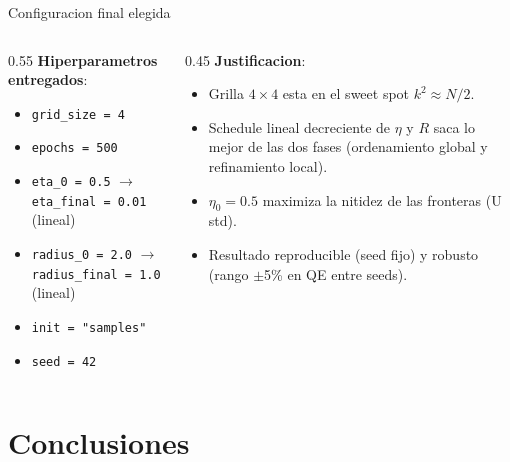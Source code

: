 \documentclass[aspectratio=169, 10pt]{beamer}
\begin{document}
\begin{frame}{Configuracion final elegida}
  \footnotesize
  \begin{columns}[T]
    \begin{column}{0.55\textwidth}
      \textbf{Hiperparametros entregados}:
      \begin{itemize}
        \item \texttt{grid\_size = 4}
        \item \texttt{epochs = 500}
        \item \texttt{eta\_0 = 0.5} $\to$ \texttt{eta\_final = 0.01} (lineal)
        \item \texttt{radius\_0 = 2.0} $\to$ \texttt{radius\_final = 1.0} (lineal)
        \item \texttt{init = "samples"}
        \item \texttt{seed = 42}
      \end{itemize}
    \end{column}
    \begin{column}{0.45\textwidth}
      \textbf{Justificacion}:
      \begin{itemize}
        \item Grilla $4 \times 4$ esta en el sweet spot $k^2 \approx N/2$.
        \item Schedule lineal decreciente de $\eta$ y $R$ saca lo mejor de las dos fases (ordenamiento global y refinamiento local).
        \item $\eta_0 = 0.5$ maximiza la nitidez de las fronteras (U std).
        \item Resultado \alert{reproducible} (seed fijo) y \alert{robusto} (rango $\pm$5\% en QE entre seeds).
      \end{itemize}
    \end{column}
  \end{columns}
\end{frame}


\section{Conclusiones}
\end{document}
